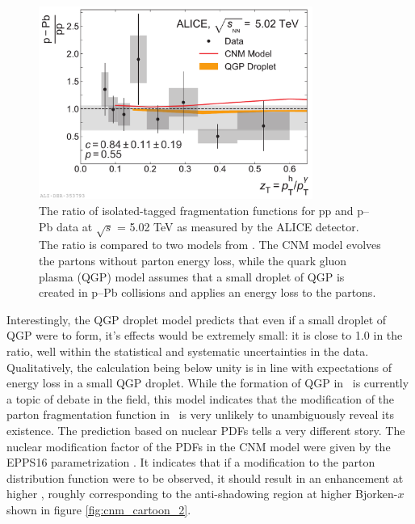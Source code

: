 {\begin{figure}[htpb]
  \centering
  \includegraphics[width=0.8\textwidth]{FF_Model_Comparisons_Ratio.pdf}
  \caption{The ratio of isolated-tagged fragmentation functions for pp and p–Pb data at $\sqrt{s}$ = 5.02 TeV as measured by the ALICE detector.  The ratio is compared to two models from \cite{Xie2021}. The CNM model evolves the partons without parton energy loss, while the quark gluon plasma (QGP) model assumes that a small droplet of QGP is created in p–Pb collisions and applies an energy loss to the partons.}
  \label{fig:FF_model}
\end{figure}
Interestingly, the QGP droplet model predicts that even if a small droplet of QGP were to form, it's effects would be extremely small: it is close to 1.0 in the ratio, well within the statistical and systematic uncertainties in the data. Qualitatively, the calculation being below unity is in line with expectations of energy loss in a small QGP droplet. While the formation of QGP in \pPb~is currently a topic of debate in the field, this model indicates that the modification of the parton fragmentation function in \pPb~is very unlikely to unambiguously reveal its existence. The prediction based on nuclear PDFs tells a very different story. The nuclear modification factor of the PDFs in the CNM model were given by the EPPS16 parametrization \cite{Eskola2017a}. It indicates that if a modification to the parton distribution function were to be observed, it should result in an enhancement at higher \zt, roughly corresponding to the anti-shadowing region at higher Bjorken-$x$ shown in figure \ref{fig:cnm_cartoon_2}. 

}
